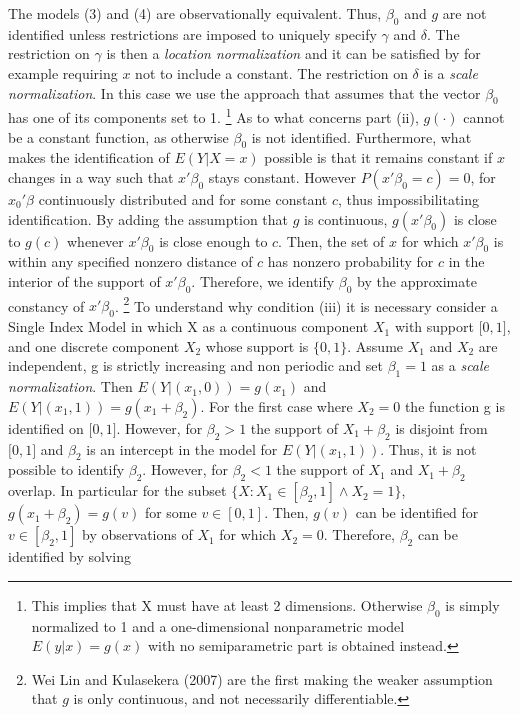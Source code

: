 \documentclass[a4paper]{article}
\begin{document}
The models (3) and (4) are observationally equivalent. Thus, $\beta_0$ and $g$ are not identified unless restrictions are imposed to uniquely specify $\gamma$ and $\delta$. The restriction on $\gamma$ is then a \textit{location normalization} and it can be satisfied by for example requiring $x$ not to include a constant. The restriction on $\delta$ is a \textit{scale normalization}. In this case we use the approach that assumes that the vector $\beta_0$ has one of its components set to 1. \footnote{This implies that X must have at least 2 dimensions. Otherwise $\beta_0$ is simply normalized to 1 and a one-dimensional nonparametric model $E(y|x) = g(x)$ with no semiparametric part is obtained instead.}
As to what concerns part (ii), $g(\cdot)$ cannot be a constant function, as otherwise $\beta_0$ is not identified. Furthermore, what makes the identification of $E(Y|X = x)$ possible is that it remains constant if $x$ changes in a way such that $x'\beta_0$ stays constant. However $P(x'\beta_0 = c)=0$, for $x_0'\beta$ continuously distributed and for some constant $c$, thus impossibilitating identification. By adding the assumption that $g$ is continuous, $g(x'\beta_0)$ is close to $g(c)$ whenever $x'\beta_0$ is close enough to $c$. Then, the set of $x$ for which $x'\beta_0$ is within any specified nonzero distance of $c$ has nonzero probability for $c$ in the interior of the support of $x'\beta_0$. Therefore, we identify $\beta_0$ by the approximate constancy of $x'\beta_0$. \footnote{Wei Lin and Kulasekera (2007) are the first making the weaker assumption that $g$ is only continuous, and not necessarily differentiable.}
To understand why condition (iii) it is necessary consider a Single Index Model in which X as a continuous component $X_1$ with support $\big[0,1\big]$, and one discrete component $X_2$ whose support is $\{0,1\}$. Assume $X_1$ and $X_2$ are independent, g is strictly increasing and non periodic and set $\beta_1 = 1$ as a \textit{scale normalization}. Then $E(Y|(x_1,0)) = g(x_1)$ and $E(Y|(x_1,1)) = g(x_1 + \beta_2)$. For the first case where $X_2 = 0$ the function g is identified on $\big[0,1\big]$. However, for $\beta_2 > 1$ the support of $ X_1 + \beta_2$ is disjoint from $\big[0,1\big]$ and $\beta_2$ is an intercept in the model for $E(Y|(x_1,1))$. Thus, it is not possible to identify $\beta_2$. However, for $\beta_2 < 1$ the support of $X_1$ and $X_1 + \beta_2$ overlap. In particular for the subset $\{X: X_1 \in [ \beta_2, 1] \wedge X_2 = 1\}$, $g(x_1 + \beta_2) = g(v)$ for some $v \in [0,1]$. Then, $g(v)$ can be identified for $v \in [\beta_2, 1]$ by observations of $X_1$ for which $X_2 = 0$. Therefore, $\beta_2$ can be identified by solving
\end{document}
